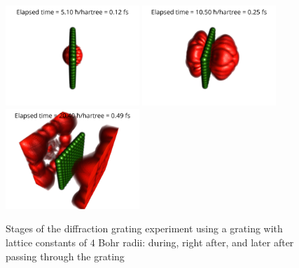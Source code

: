 \begin{figure}[hbtp!]
	\begin{center}
		\includegraphics[width=0.45\textwidth]{figures/optical_grid_01.png}
		\includegraphics[width=0.45\textwidth]{figures/optical_grid_02.png}
		\includegraphics[width=0.45\textwidth]{figures/optical_grid_03.png}
		\caption{Stages of the diffraction grating experiment using a grating with lattice constants of $4$ Bohr radii: during, right after, and later after passing through the grating}
		\label{fig:optical_grid_stages}
	\end{center}	
\end{figure}
